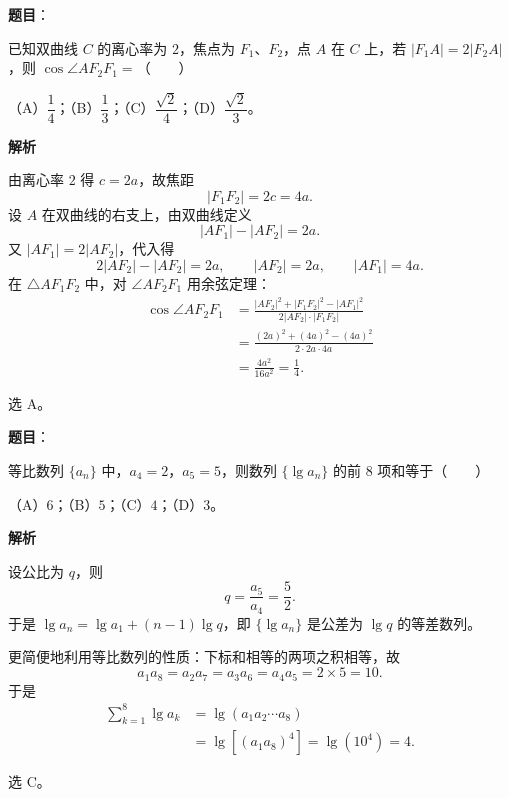 \begin{answer}

\textbf{题目}：

已知双曲线 $C$ 的离心率为 $2$，焦点为 $F_1$、$F_2$，点 $A$ 在 $C$ 上，若 $|F_1A|=2|F_2A|$，则 $\cos\angle AF_2F_1=$\mbox{（　　）}

（A）$\dfrac14$；（B）$\dfrac13$；（C）$\dfrac{\sqrt2}{4}$；（D）$\dfrac{\sqrt2}{3}$。

\textbf{解析}

由离心率 $2$ 得 $c=2a$，故焦距
\nopagebreak[4]
\[|F_1F_2|=2c=4a.\]
设 $A$ 在双曲线的右支上，由双曲线定义
\nopagebreak[4]
\[|AF_1|-|AF_2|=2a.\]
又 $|AF_1|=2|AF_2|$，代入得
\nopagebreak[4]
\[2|AF_2|-|AF_2|=2a,\qquad |AF_2|=2a,\qquad |AF_1|=4a.\]
在 $\triangle AF_1F_2$ 中，对 $\angle AF_2F_1$ 用余弦定理：
\nopagebreak[4]
\[\begin{aligned}
\cos\angle AF_2F_1
&=\frac{|AF_2|^2+|F_1F_2|^2-|AF_1|^2}{2|AF_2|\cdot|F_1F_2|}\\
&=\frac{(2a)^2+(4a)^2-(4a)^2}{2\cdot2a\cdot4a}\\
&=\frac{4a^2}{16a^2}=\frac14.
\end{aligned}\]

选 A。


\end{answer}
\begin{answer}

\textbf{题目}：

等比数列 $\{a_n\}$ 中，$a_4=2$，$a_5=5$，则数列 $\{\lg a_n\}$ 的前 $8$ 项和等于\mbox{（　　）}

（A）$6$；（B）$5$；（C）$4$；（D）$3$。

\textbf{解析}

设公比为 $q$，则
\nopagebreak[4]
\[q=\frac{a_5}{a_4}=\frac52.\]
于是 $\lg a_n=\lg a_1+(n-1)\lg q$，即 $\{\lg a_n\}$ 是公差为 $\lg q$ 的等差数列。

更简便地利用等比数列的性质：下标和相等的两项之积相等，故
\nopagebreak[4]
\[a_1a_8=a_2a_7=a_3a_6=a_4a_5=2\times5=10.\]
于是
\nopagebreak[4]
\[\begin{aligned}
\sum_{k=1}^{8}\lg a_k
&=\lg(a_1a_2\cdots a_8)\\
&=\lg\left[(a_1a_8)^4\right]
=\lg\left(10^4\right)=4.
\end{aligned}\]

选 C。


\end{answer}
